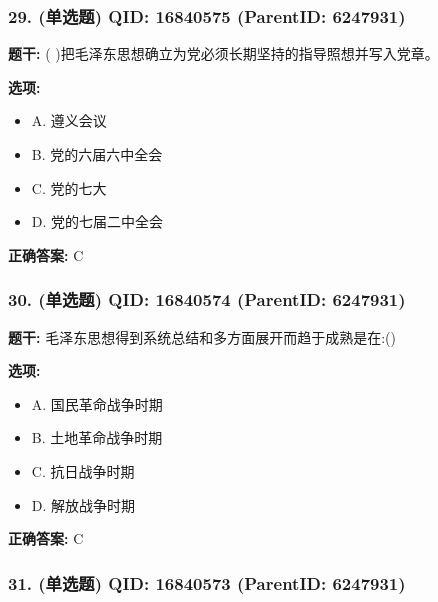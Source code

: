 \documentclass[12pt,UTF8]{ctexart}
\begin{document}
\subsubsection*{29. (单选题) \small QID: 16840575 (ParentID: 6247931)}

\textbf{题干:}
( )把毛泽东思想确立为党必须长期坚持的指导照想并写入党章。



\textbf{选项:}
\begin{itemize}[leftmargin=*]

  \item A. 遵义会议

  \item B. 党的六届六中全会

  \item C. 党的七大

  \item D. 党的七届二中全会

\end{itemize}

\textbf{正确答案:}
C

\vspace{0.3em}\hrulefill\vspace{0.7em}

\subsubsection*{30. (单选题) \small QID: 16840574 (ParentID: 6247931)}

\textbf{题干:}
毛泽东思想得到系统总结和多方面展开而趋于成熟是在:()



\textbf{选项:}
\begin{itemize}[leftmargin=*]

  \item A. 国民革命战争时期

  \item B. 土地革命战争时期

  \item C. 抗日战争时期

  \item D. 解放战争时期

\end{itemize}

\textbf{正确答案:}
C

\vspace{0.3em}\hrulefill\vspace{0.7em}

\subsubsection*{31. (单选题) \small QID: 16840573 (ParentID: 6247931)}
\end{document}
